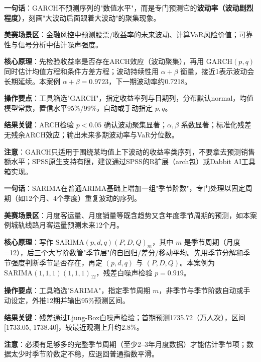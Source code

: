 
\begin{algobrief}
\textbf{一句话}：GARCH不预测序列的"数值水平"，而是专门预测它的\textbf{波动率（波动剧烈程度）}，刻画"大波动后面跟着大波动"的聚集现象。

\textbf{美赛场景区}：金融风控中预测股票/收益率的未来波动、计算VaR风险价值；可靠性与信号分析中估计噪声强度。

\textbf{核心原理}：先检验收益率是否存在ARCH效应（波动聚集），再用 $\mathrm{GARCH}(p,q)$ 同时估计均值方程和条件方差方程；波动持续性用 $\alpha+\beta$ 衡量，接近1表示波动会长期延续。本案例 $\alpha+\beta=0.9723$，下一期波动率约0.7218。

\textbf{操作要点}：工具箱选"GARCH"，指定收益率列与日期列，分布默认normal，均值模型常数，置信水平95\%/99\%，自动或手动指定 $p,q$。

\textbf{结果关键}：ARCH检验 $p<0.05$ 确认波动聚集显著；$\alpha,\beta$ 系数显著；标准化残差无残余ARCH效应；输出未来多期波动率与VaR分位数。

\textbf{注意}：GARCH只适用于围绕某均值上下波动的收益率类序列，不要拿去预测销售额水平；SPSS原生支持有限，建议通过SPSS的R扩展（arch包）或Dabbit AI工具箱实现。
\end{algobrief}


\begin{algobrief}
\textbf{一句话}：SARIMA在普通ARIMA基础上增加一组"季节阶数"，专门处理以固定周期（如12个月、4个季度）重复波动的序列。

\textbf{美赛场景区}：月度客运量、月度销量等既含趋势又含年度季节周期的预测，如本案例城轨线路月客运量预测未来12个月。

\textbf{核心原理}：写作 $\mathrm{SARIMA}(p,d,q)(P,D,Q)_m$，其中 $m$ 是季节周期（月度=12），后三个大写阶数管"季节层"的自回归/差分/移动平均。先用季节分解和季节强度判断季节是否存在，再定 $(p,d,q)$ 与 $(P,D,Q)$。本案例为 $\mathrm{SARIMA}(1,1,1)(1,1,1)_{12}$，残差白噪声检验 $p=0.919$。

\textbf{操作要点}：工具箱选"SARIMA"，指定季节周期 $m$，非季节与季节阶数自动或手动设定，外推12期并输出95\%预测区间。

\textbf{结果关键}：残差通过Ljung-Box白噪声检验；首期预测1735.72（万人次），区间[1733.05, 1738.40]，较最近观测上升约2.8\%。

\textbf{注意}：必须有足够多的完整季节周期（至少2--3年月度数据）才能估计季节项；数据太少时季节阶数定不稳，应退回普通指数平滑。
\end{algobrief}

